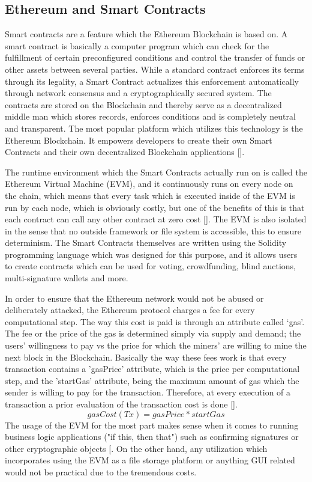 \subsection{Ethereum and Smart Contracts}
Smart contracts are a feature which the Ethereum Blockchain is based on. A smart contract is basically a computer program which can check for the fulfillment of certain preconfigured conditions and control the transfer of funds or other assets between several parties. While a standard contract enforces its terms through its legality, a Smart Contract actualizes this enforcement automatically through network consensus and a cryptographically secured system. The contracts are stored on the Blockchain and thereby serve as a decentralized middle man which stores records, enforces conditions and is completely neutral and transparent. The most popular platform which utilizes this technology is the Ethereum Blockchain. It empowers developers to create their own Smart Contracts and their own decentralized Blockchain applications [\cite{relatedWork38}].

The runtime environment which the Smart Contracts actually run on is called the Ethereum Virtual Machine (EVM), and it continuously runs on every node on the chain, which means that every task which is executed inside of the EVM is run by each node, which is obviously costly, but one of the benefits of this is that each contract can call any other contract at zero cost [\cite{relatedWork38}]. The EVM is also isolated in the sense that no outside framework or file system is accessible, this to ensure determinism. The Smart Contracts themselves are written using the Solidity programming language which was designed for this purpose, and it allows users to create contracts which can be used for voting, crowdfunding, blind auctions, multi-signature wallets and more.

In order to ensure that the Ethereum network would not be abused or deliberately attacked, the Ethereum protocol charges a fee for every computational step. The way this cost is paid is through an attribute called ‘gas’. The fee or the price of the gas is determined simply via supply and demand; the users’ willingness to pay vs the price for which the miners' are willing to mine the next block in the Blockchain. Basically the way these fees work is that every transaction contains a 'gasPrice' attribute, which is the price per computational step, and the 'startGas' attribute, being the maximum amount of gas which the sender is willing to pay for the transaction. Therefore, at every execution of a transaction a prior evaluation of the transaction cost is done [\cite{relatedWork38}].
				$$ gasCost(Tx)= {gasPrice * startGas} $$
The usage of the EVM for the most part makes sense when it comes to running business logic applications ("if this, then that") such as confirming signatures or other cryptographic objects [\cite{relatedWork39}. On the other hand, any utilization which incorporates using the EVM as a file storage platform or anything GUI related would not be practical due to the tremendous costs.

